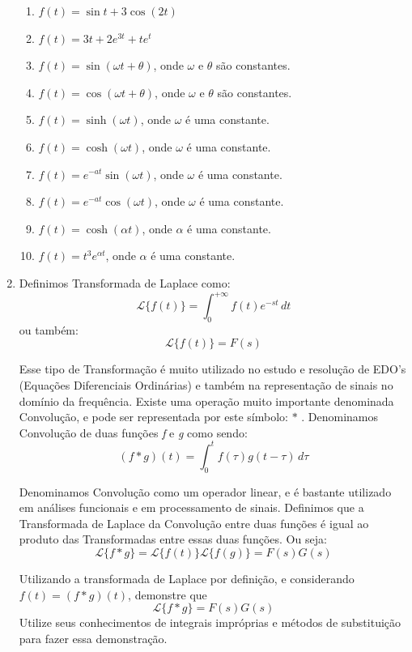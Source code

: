 \documentclass[11pt,a4paper]{article}
\newcommand{\integral}{\displaystyle\int}
\begin{document}
\begin{enumerate}
		\begin{enumerate}
		\item $f(t) = \sin t + 3\cos (2t) $
		\item $f(t) = 3t + 2e^{3t} + te^t$
		\item $f(t) = \sin (\omega t + \theta)$, onde $\omega$ e $\theta$ são constantes.
		\item $f(t) = \cos (\omega t + \theta)$, onde $\omega$ e $\theta$ são constantes.
		\item $f(t) = \sinh (\omega t)$, onde $\omega$ é uma constante.
		\item $f(t) = \cosh (\omega t)$, onde $\omega$ é uma constante.
		\item $f(t) = e^{-at} \sin (\omega t)$, onde $\omega$ é uma constante.
		\item $f(t) = e^{-at} \cos (\omega t)$, onde $\omega$ é uma constante.
		\item $f(t) = \cosh (\alpha t)$, onde $\alpha$ é uma constante.
		\item $f(t) = t^3 e^{\alpha t}$, onde $\alpha$ é uma constante.
		
		\end{enumerate}
		
		\item Definimos Transformada de Laplace como: 
		$$\mathscr{L}\{f(t)\} = \integral_0^{+\infty} f(t) e^{-st} \, dt$$ ou também: 
		$$\mathscr{L}\{f(t)\}=F(s)$$
		
		
		Esse tipo de Transformação é muito utilizado no estudo e resolução de EDO's (Equações Diferenciais
		Ordinárias) e também na representação de sinais no domínio da frequência. Existe uma operação muito
		importante denominada Convolução, e pode ser representada por este símbolo: $\ast$ . Denominamos 
		Convolução de duas funções \textit{f} e \textit{g} como sendo:
		$$(f \ast g)(t) = \integral_0^t f(\tau)g(t - \tau) \, d\tau$$
	
		Denominamos Convolução como um operador linear, e é bastante utilizado em análises funcionais e em 
		processamento de sinais. Definimos que a Transformada de Laplace da Convolução entre duas funções
		é igual ao produto das Transformadas entre essas duas funções. Ou seja:
		$$\mathscr{L}\{f \ast g\} = \mathscr{L}\{f(t)\}\mathscr{L}\{f(g)\} = F(s)G(s)$$
		
		Utilizando a transformada de Laplace por definição, e considerando $f(t) = (f \ast g)(t)$, 						demonstre que
		$$\mathscr{L}\{f \ast g\} = F(s)G(s)$$ 
		Utilize seus conhecimentos de integrais impróprias e métodos de substituição para fazer essa 					demonstração.
		

\end{enumerate}
\end{document}
